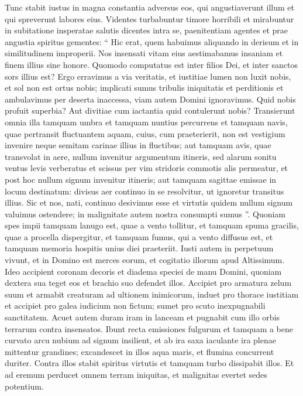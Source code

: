\begin{biblechapter}
\begin{biblechapter}
\begin{biblechapter}
\begin{biblechapter}
\begin{biblechapter}
\verse Tunc stabit iustus in magna constantia
 adversus eos, qui angustiaverunt illum
 et qui spreverunt labores eius.
 \verse Videntes turbabuntur timore horribili
 et mirabuntur in subitatione insperatae salutis
 \verse dicentes intra se, paenitentiam agentes
 et prae angustia spiritus gementes:
 \verse “ Hic erat, quem habuimus aliquando in derisum
 et in similitudinem improperii.
 Nos insensati vitam eius aestimabamus insaniam
 et finem illius sine honore.
 \verse Quomodo computatus est inter filios Dei,
 et inter sanctos sors illius est?
 \verse Ergo erravimus a via veritatis,
 et iustitiae lumen non luxit nobis,
 et sol non est ortus nobis;
 \verse implicati sumus tribulis iniquitatis et perditionis
 et ambulavimus per deserta inaccessa,
 viam autem Domini ignoravimus.
 \verse Quid nobis profuit superbia?
 Aut divitiae cum iactantia quid contulerunt nobis?
 \verse Transierunt omnia illa tamquam umbra
 et tamquam nuntius percurrens
 \verse et tamquam navis, quae pertransit fluctuantem aquam,
 cuius, cum praeterierit, non est vestigium invenire
 neque semitam carinae illius in fluctibus;
 \verse aut tamquam avis, quae transvolat in aere,
 nullum invenitur argumentum itineris,
 sed alarum sonitu ventus levis verberatus
 et scissus per vim stridoris
 commotis alis permeatur,
 et post hoc nullum signum invenitur itineris;
 \verse aut tamquam sagittae emissae in locum destinatum:
 divisus aer continuo in se resolvitur,
 ut ignoretur transitus illius.
 \verse Sic et nos, nati, continuo desivimus esse
 et virtutis quidem nullum signum valuimus ostendere;
 in malignitate autem nostra consumpti sumus ”.
 \verse Quoniam spes impii tamquam lanugo est, quae a vento tollitur,
 et tamquam spuma gracilis, quae a procella dispergitur,
 et tamquam fumus, qui a vento diffusus est,
 et tamquam memoria hospitis unius diei praeteriit.
 \verse Iusti autem in perpetuum vivunt,
 et in Domino est merces eorum,
 et cogitatio illorum apud Altissimum.
 \verse Ideo accipient coronam decoris
 et diadema speciei de manu Domini,
 quoniam dextera sua teget eos
 et brachio suo defendet illos.
 \verse Accipiet pro armatura zelum suum
 et armabit creaturam ad ultionem inimicorum,
 \verse induet pro thorace iustitiam
 et accipiet pro galea iudicium non fictum;
 \verse sumet pro scuto inexpugnabili sanctitatem.
 \verse Acuet autem duram iram in lanceam
 et pugnabit cum illo orbis terrarum contra insensatos.
 \verse Ibunt recta emissiones fulgurum
 et tamquam a bene curvato arcu nubium ad signum insilient,
 \verse et ab ira saxa iaculante
 ira plenae mittentur grandines;
 excandescet in illos aqua maris,
 et flumina concurrent duriter.
 \verse Contra illos stabit spiritus virtutis
 et tamquam turbo dissipabit illos.
 Et ad eremum perducet omnem terram iniquitas,
 et malignitas evertet sedes potentium.
 

\end{biblechapter}
\end{biblechapter}
\end{biblechapter}
\end{biblechapter}
\end{biblechapter}
